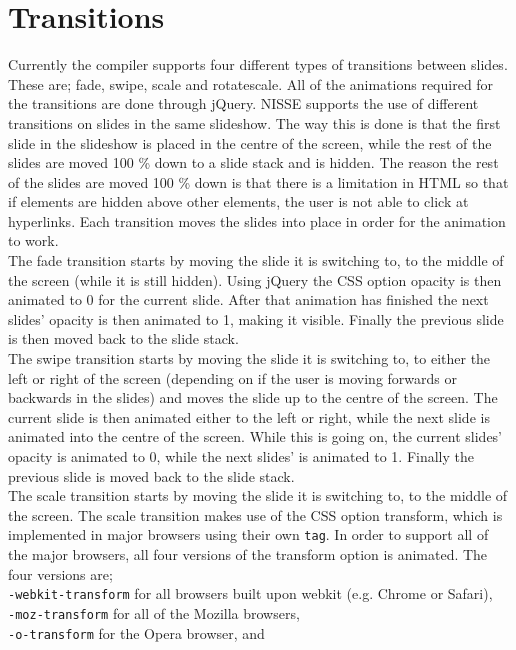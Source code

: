 \section{Transitions}
Currently the compiler supports four different types of transitions between slides. These are; fade, swipe, scale and rotatescale. All of the animations required for the transitions are done through jQuery. NISSE supports the use of different transitions on slides in the same slideshow. The way this is done is that the first slide in the slideshow is placed in the centre of the screen, while the rest of the slides are moved 100 \% down to a slide stack and is hidden. The reason the rest of the slides are moved 100 \% down is that there is a limitation in HTML so that if elements are hidden above other elements, the user is not able to click at hyperlinks. Each transition moves the slides into place in order for the animation to work.\\
The fade transition starts by moving the slide it is switching to, to the middle of the screen (while it is still hidden). Using jQuery the CSS option opacity is then animated to 0 for the current slide. After that animation has finished the next slides' opacity is then animated to 1, making it visible. Finally the previous slide is then moved back to the slide stack. \\
The swipe transition starts by moving the slide it is switching to, to either the left or right of the screen (depending on if the user is moving forwards or backwards in the slides) and moves the slide up to the centre of the screen. The current slide is then animated either to the left or right, while the next slide is animated into the centre of the screen. While this is going on, the current slides' opacity is animated to 0, while the next slides' is animated to 1. Finally the previous slide is moved back to the slide stack. \\
The scale transition starts by moving the slide it is switching to, to the middle of the screen. The scale transition makes use of the CSS option transform, which is implemented in major browsers using their own \texttt{tag}. In order to support all of the major browsers, all four versions of the transform option is animated. The four versions are; \\
\texttt{-webkit-transform} for all browsers built upon webkit (e.g. Chrome or Safari), \\
\texttt{-moz-transform} for all of the Mozilla browsers, \\
\texttt{-o-transform} for the Opera browser, and \\
